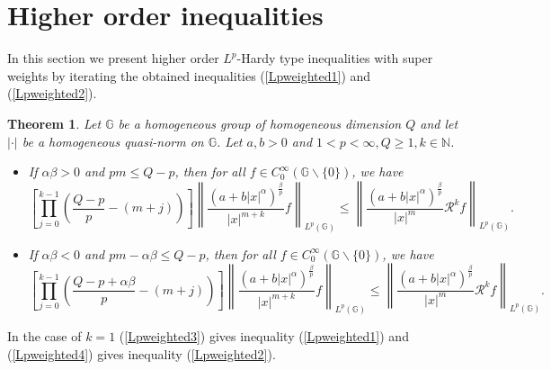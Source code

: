 \documentclass[a4paper,12pt,reqno]{amsart}
\renewcommand\eqref[1]{(\ref{#1})} %
\numberwithin{equation}{section}
\theoremstyle{plain}
\newtheorem{thm}{Theorem}[section]
\theoremstyle{definition}
\begin{document}
\section{Higher order inequalities}
\label{Sec3}
In this section we present higher order $L^{p}$-Hardy type inequalities with super weights by iterating the obtained inequalities
\eqref{Lpweighted1} and \eqref{Lpweighted2}.
\begin{thm}\label{2}
Let $\mathbb{G}$ be a homogeneous group
of homogeneous dimension $Q$ and let $|\cdot|$ be a homogeneous quasi-norm on $\mathbb{G}$. Let $a,b>0$ and $1<p<\infty, Q\geq1, k\in \mathbb{N}$.
\begin{itemize}
\item[(i)] If $\alpha \beta>0$ and $pm\leq Q-p$, then for all $f\in C_{0}^{\infty}(\mathbb{G}\backslash\{0\})$, we have
\begin{equation}\label{Lpweighted3}
\left[\prod_{j=0}^{k-1}\left(\frac{Q-p}{p}-(m+j)\right)\right]
\left\|\frac{(a+b|x|^{\alpha})^{\frac{\beta}{p}}}{|x|^{m+k}}f\right\|_{L^{p}(\mathbb{G})}
\leq\left\|\frac{(a+b|x|^{\alpha})^{\frac{\beta}{p}}}{|x|^{m}}\mathcal{R}^{k}f\right\|_{L^{p}(\mathbb{G})}
.
\end{equation}

\item[(ii)] If $\alpha \beta<0$ and $pm-\alpha\beta\leq Q-p$, then for all $f\in C_{0}^{\infty}(\mathbb{G}\backslash\{0\})$, we have
\begin{equation}\label{Lpweighted4}
\left[\prod_{j=0}^{k-1}\left(\frac{Q-p+\alpha\beta}{p}-(m+j)\right)\right]
\left\|\frac{(a+b|x|^{\alpha})^{\frac{\beta}{p}}}{|x|^{m+k}}f\right\|_{L^{p}(\mathbb{G})}
\leq\left\|\frac{(a+b|x|^{\alpha})^{\frac{\beta}{p}}}{|x|^{m}}\mathcal{R}^{k}f\right\|_{L^{p}(\mathbb{G})}
.
\end{equation}
\end{itemize}
\end{thm}
In the case of $k=1$ \eqref{Lpweighted3} gives inequality \eqref{Lpweighted1} and \eqref{Lpweighted4} gives inequality \eqref{Lpweighted2}.
\end{document}
